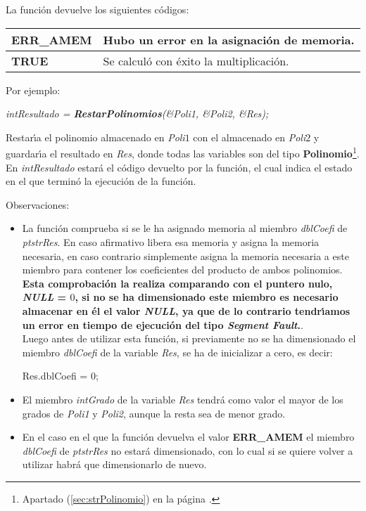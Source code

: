 La funci\'on devuelve los siguientes c\'odigos:

\begin{center}
\begin{tabular}{|l|l|}
\hline
\textbf{ERR\_AMEM} & Hubo un error en la asignaci\'on de memoria. \\
\hline
\textbf{TRUE} & Se calcul\'o con \'exito la multiplicaci\'on. \\
\hline
\end{tabular}
\end{center}

Por ejemplo:

\begin{center}
\emph{intResultado = \textbf{RestarPolinomios}(\&Poli1, \&Poli2, \&Res);}
\end{center}

Restar\'{\i}a el polinomio almacenado en \emph{Poli$1$} con el almacenado
en \emph{Poli$2$} y guardar\'{\i}a el resultado en \emph{Res}, donde todas las
variables son del tipo \textbf{Polinomio}\footnote{Apartado 
(\ref{sec:strPolinomio}) en la p\'agina \pageref{sec:strPolinomio}.}.\\

En \emph{intResultado} estar\'a el c\'odigo devuelto por la funci\'on, el cual
indica el estado en el que termin\'o la ejecuci\'on de la funci\'on.\newline

Observaciones:

\begin{itemize}
\item La funci\'on comprueba si se le ha asignado memoria al miembro 
\emph{dblCoefi} de \emph{ptstrRes}. En caso afirmativo libera esa
memoria y asigna la memoria necesaria, en caso contrario simplemente asigna
la memoria necesaria a este miembro para contener los coeficientes del
producto de ambos polinomios.\\

\textbf{Esta comprobaci\'on la realiza comparando con el puntero nulo, 
\emph{NULL} = $0$, si no se ha dimensionado este miembro es necesario almacenar
en \'el el valor \emph{NULL}, ya que de lo contrario tendr\'{\i}amos un error
en tiempo de ejecuci\'on del tipo \emph{Segment Fault}.}.\\

Luego antes de utilizar esta funci\'on, si previamente no se ha dimensionado
el miembro \emph{dblCoefi} de la variable \emph{Res}, se ha de inicializar
a cero, es decir:

\begin{center}
Res.dblCoefi = 0;
\end{center}
\item El miembro \emph{intGrado} de la variable \emph{Res} tendr\'a como
valor el mayor de los grados de \emph{Poli1} y \emph{Poli2}, aunque la resta
sea de menor grado.
\item En el caso en el que la funci\'on devuelva el valor \textbf{ERR\_AMEM} el
miembro \emph{dblCoefi} de \emph{ptstrRes} no estar\'a dimensionado, con lo
cual si se quiere volver a utilizar habr\'a que dimensionarlo de nuevo.
\end{itemize}

